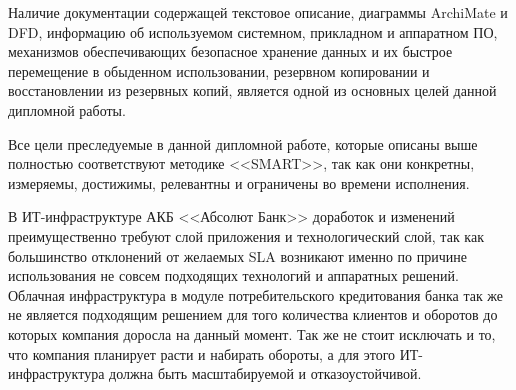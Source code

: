 \documentclass[14pt, a4paper]{extarticle}
\begin{document}
Наличие документации содержащей текстовое описание, диаграммы ArchiMate и DFD,
информацию об используемом системном, прикладном и аппаратном ПО, механизмов
обеспечивающих безопасное хранение данных и их быстрое перемещение в обыденном
использовании, резервном копировании и восстановлении из резервных копий,
является одной из основных целей данной дипломной работы. 

Все цели преследуемые в данной дипломной работе, которые описаны выше полностью
соответствуют методике <<SMART>>, так как они конкретны, измеряемы, достижимы,
релевантны и ограничены во времени исполнения.

В ИТ-инфраструктуре АКБ <<Абсолют Банк>> доработок и изменений преимущественно
требуют слой приложения и технологический слой, так как большинство отклонений
от желаемых SLA возникают именно по причине использования не совсем подходящих
технологий и аппаратных решений. Облачная инфраструктура в модуле
потребительского кредитования банка так же не является подходящим решением для
того количества клиентов и оборотов до которых компания доросла на данный
момент. Так же не стоит исключать и то, что компания планирует расти и набирать
обороты, а для этого ИТ-инфраструктура должна быть масштабируемой и
отказоустойчивой.


\begingroup
	\let\itshape\upshape
	\sloppy
	\raggedright
	\printbibliography[title=СПИСОК ИСПОЛЬЗУЕМЫХ ИСТОЧНИКОВ]
\endgroup
\end{document}
